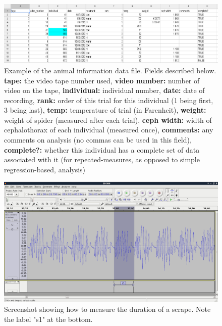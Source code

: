 \documentclass[11 pt]{article}
\begin{document}
\begin{figure}[htp]
\centering
\includegraphics[scale=.85]{animal_info.png}
\caption{Example of the animal information data file.  Fields described below.  {\bfseries tape:} the video tape number used, {\bfseries video number:} number of video on the tape, {\bfseries individual:} individual number,  {\bfseries date:} date of recording, {\bfseries rank:} order of this trial for this individual (1 being first, 3 being last), {\bfseries temp:} temperature of trial (in Farenheit), {\bfseries weight:} weight of spider (measured after each trial), {\bfseries ceph width:} width of cephalothorax of each individual (measured once), {\bfseries comments:} any comments on analysis (no commas can be used in this field), {\bfseries complete?:} whether this individual has a complete set of data associated with it (for repeated-measures, as opposed to simple regression-based, analysis)}
\label{aninfo}
\end{figure}

\begin{figure}[htp]
\centering
\includegraphics[scale=.30]{scrape_duration.png}
\caption{Screenshot showing how to measure the duration of a scrape.  Note the label "s1" at the bottom.}
\label{scrapedur}
\end{figure}
\end{document}
